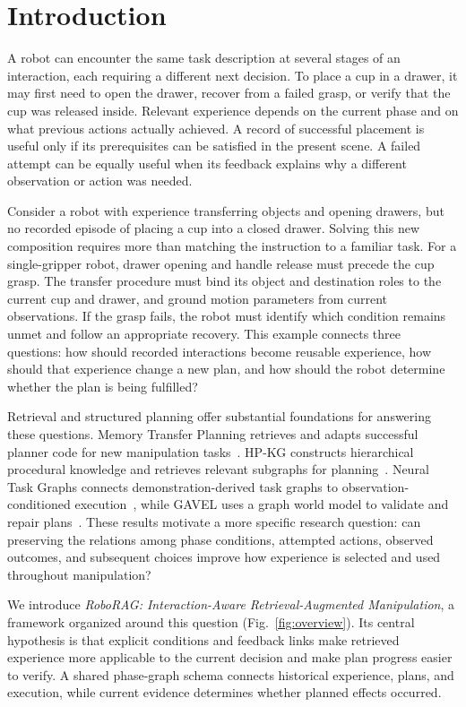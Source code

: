 \section{Introduction}
\label{sec:introduction}

A robot can encounter the same task description at several stages of an interaction, each requiring a different next decision. To place a cup in a drawer, it may first need to open the drawer, recover from a failed grasp, or verify that the cup was released inside. Relevant experience depends on the current phase and on what previous actions actually achieved. A record of successful placement is useful only if its prerequisites can be satisfied in the present scene. A failed attempt can be equally useful when its feedback explains why a different observation or action was needed.

Consider a robot with experience transferring objects and opening drawers, but no recorded episode of placing a cup into a closed drawer. Solving this new composition requires more than matching the instruction to a familiar task. For a single-gripper robot, drawer opening and handle release must precede the cup grasp. The transfer procedure must bind its object and destination roles to the current cup and drawer, and ground motion parameters from current observations. If the grasp fails, the robot must identify which condition remains unmet and follow an appropriate recovery. This example connects three questions: how should recorded interactions become reusable experience, how should that experience change a new plan, and how should the robot determine whether the plan is being fulfilled?

Retrieval and structured planning offer substantial foundations for answering these questions. Memory Transfer Planning retrieves and adapts successful planner code for new manipulation tasks~\cite{mtp2025}. HP-KG constructs hierarchical procedural knowledge and retrieves relevant subgraphs for planning~\cite{hpkg2025}. Neural Task Graphs connects demonstration-derived task graphs to observation-conditioned execution~\cite{ntg2019}, while GAVEL uses a graph world model to validate and repair plans~\cite{gavel2026}. These results motivate a more specific research question: can preserving the relations among phase conditions, attempted actions, observed outcomes, and subsequent choices improve how experience is selected and used throughout manipulation?

We introduce \emph{RoboRAG: Interaction-Aware Retrieval-Augmented Manipulation}, a framework organized around this question (Fig.~\ref{fig:overview}). Its central hypothesis is that explicit conditions and feedback links make retrieved experience more applicable to the current decision and make plan progress easier to verify. A shared phase-graph schema connects historical experience, plans, and execution, while current evidence determines whether planned effects occurred.

